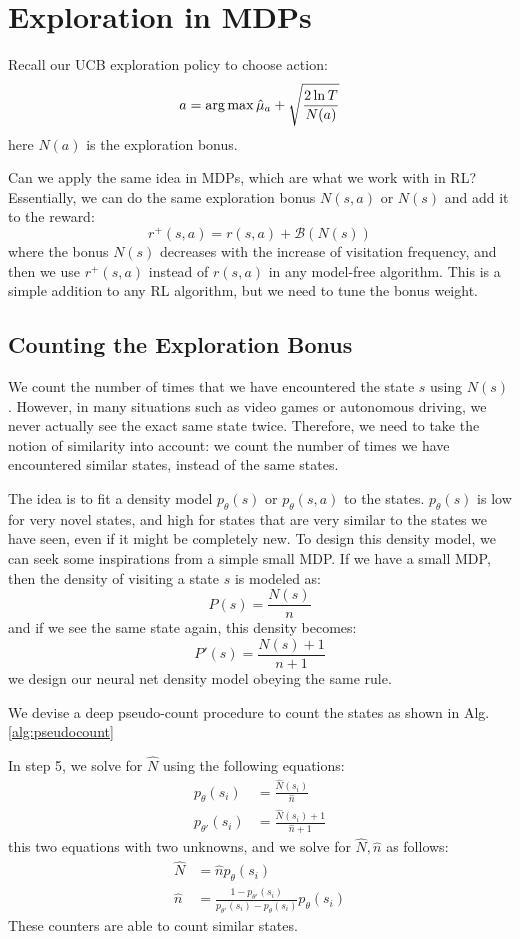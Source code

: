 \section{Exploration in MDPs}
Recall our UCB exploration policy to choose action:
\[
a = \operatorname*{arg\,max}\hat{\mu}_a + \sqrt{\frac{2\ln T}{N(a)}}
\]
here $N(a)$ is the exploration bonus.

Can we apply the same idea in MDPs, which are what we work with in RL? Essentially, we can do the same exploration bonus $N(s,a)$ or $N(s)$ and add it to the reward:
\[
r^+(s,a) = r(s,a) + \mathcal{B}(N(s))
\]
where the bonus $N(s)$ decreases with the increase of visitation frequency, and then we use $r^+(s,a)$ instead of $r(s,a)$ in any model-free algorithm. This is a simple addition to any RL algorithm, but we need to tune the bonus weight.

\subsection{Counting the Exploration Bonus}
We count the number of times that we have encountered the state $s$ using $N(s)$. However, in many situations such as video games or autonomous driving, we never actually see the exact same state twice. Therefore, we need to take the notion of similarity into account: we count the number of times we have encountered similar states, instead of the same states. 

The idea is to fit a density model $p_\theta(s)$ or $p_\theta(s,a)$ to the states. $p_\theta(s)$ is low for very novel states, and high for states that are very similar to the states we have seen, even if it might be completely new. To design this density model, we can seek some inspirations from a simple small MDP. If we have a small MDP, then the density of visiting a state $s$ is modeled as:
\[
P(s) = \frac{N(s)}{n}
\]
and if we see the same state again, this density becomes:
\[
P'(s) = \frac{N(s)+1}{n+1}
\]
we design our neural net density model obeying the same rule. 

We devise a deep pseudo-count procedure to count the states as shown in Alg. \ref{alg:pseudocount}

In step 5, we solve for $\hat{N}$ using the following equations:
\begin{align*}
    p_\theta(s_i) &= \frac{\hat{N}(s_i)}{\hat{n}}\\
    p_{\theta'}(s_i) &= \frac{\hat{N}(s_i)+1}{\hat{n}+1}
\end{align*}
this two equations with two unknowns, and we solve for $\hat{N},\hat{n}$ as follows:
\begin{align*}
    \hat{N} &= \hat{n}p_\theta(s_i)\\
    \hat{n} &= \frac{1-p_{\theta'}(s_i)}{p_{\theta'}(s_i) - p_{\theta}(s_i)}p_{\theta}(s_i)
\end{align*}
These counters are able to count similar states.

